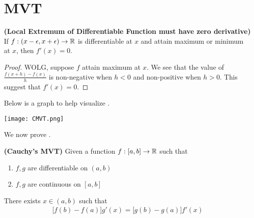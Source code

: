 \documentclass{report}
\begin{document}
\section{MVT}
\begin{abstract}
  This section introduce  and , which will be heavily used later to prove multiple important and  common results, e.g., , ,  and . For how important MVT is in the development of Theory of Calculus, it is worth pointing out that, fundamentally,  relies on the order of the real numbers, as usage of  in the proof of  suggest.
\end{abstract}
\begin{theorem}
\label{LEoDF}
\textbf{(Local Extremum of Differentiable Function must have zero derivative)} If $f:(x-\epsilon ,x+\epsilon )\rightarrow \mathbb{R}$ is differentiable at $x$ and attain maximum or minimum at  $x$, then  $f'(x)=0$. 
\end{theorem}
\begin{proof}
WOLG, suppose $f$ attain maximum at  $x$. We see that the value of $\frac{f(x+h)-f(x)}{h}$ is non-negative when $h<0$ and non-positive when  $h>0$. This suggest that  $f'(x)=0$.
\end{proof}
\begin{mdframed}
Below is a graph to help visualize .
\begin{center}
   \begin{minipage}{0.9\linewidth}  
       \centering       
\texttt{[image: CMVT.png]}
   \end{minipage}
\end{center}
We now prove . 
\end{mdframed}
\begin{theorem}
\label{CMVT}
\textbf{(Cauchy's MVT)} Given a function $f:[a,b]\to \mathbb{R}$ such that  
\begin{enumerate}[label=(\alph*)]
  \item $f,g$ are  differentiable on $(a,b)$
  \item $f,g$ are continuous on $[a,b]$
\end{enumerate}
There exists $x \in (a,b)$ such that 
 \begin{align*}
   \big[f(b)-f(a) \big]g'(x)=\big[g(b)-g(a) \big]f'(x)
\end{align*}
\end{theorem}
\end{document}
